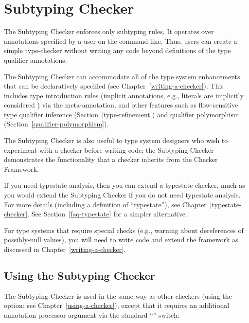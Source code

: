 \htmlhr
\chapter{Subtyping Checker\label{subtyping-checker}}

The Subtyping Checker enforces only subtyping rules.  It operates over
annotations specified by a user on the command line.  Thus, users can
create a simple type-checker without writing any code beyond definitions of
the type qualifier annotations.

The Subtyping Checker can accommodate all of the type system enhancements that
can be declaratively specified (see Chapter~\ref{writing-a-checker}).
This includes type introduction rules (implicit
annotations, e.g., literals are implicitly considered ) via
the  meta-annotation, and other features such as
flow-sensitive type qualifier inference (Section~\ref{type-refinement}) and
qualifier polymorphism (Section~\ref{qualifier-polymorphism}).

The Subtyping Checker is also useful to type system designers who wish to
experiment with a checker before writing code; the Subtyping Checker
demonstrates the functionality that a checker inherits from the Checker
Framework.

If you need typestate analysis, then you can extend a typestate checker,
much as you would extend the Subtyping Checker if you do not need typestate
analysis.  For more details (including a definition of ``typestate''), see
Chapter~\ref{typestate-checker}.
See Section~\ref{faq-typestate} for a simpler alternative.

For type systems that require special checks (e.g., warning about
dereferences of possibly-null values), you will need to write code and
extend the framework as discussed in Chapter~\ref{writing-a-checker}.


\section{Using the Subtyping Checker\label{subtyping-using}}

\begin{sloppypar}
The Subtyping Checker is used in the same way as other checkers (using the
 option; see Chapter~\ref{using-a-checker}), except that it
requires an additional annotation processor argument via the standard
``'' switch:
\end{sloppypar}

